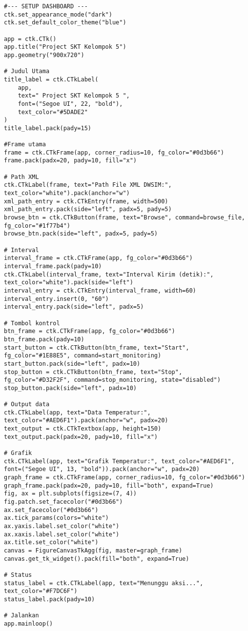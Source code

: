 \documentclass[a4paper, 12pt]{article}
\begin{document}
\begin{lstlisting}[style=pythonstyle, caption={DWSIM (python)}]
#--- SETUP DASHBOARD ---
ctk.set_appearance_mode("dark")
ctk.set_default_color_theme("blue")

app = ctk.CTk()
app.title("Project SKT Kelompok 5")
app.geometry("900x720")

# Judul Utama
title_label = ctk.CTkLabel(
    app,
    text=" Project SKT Kelompok 5 ",
    font=("Segoe UI", 22, "bold"),
    text_color="#5DADE2"
)
title_label.pack(pady=15)

#Frame utama
frame = ctk.CTkFrame(app, corner_radius=10, fg_color="#0d3b66")
frame.pack(padx=20, pady=10, fill="x")

# Path XML
ctk.CTkLabel(frame, text="Path File XML DWSIM:", text_color="white").pack(anchor="w")
xml_path_entry = ctk.CTkEntry(frame, width=500)
xml_path_entry.pack(side="left", padx=5, pady=5)
browse_btn = ctk.CTkButton(frame, text="Browse", command=browse_file, fg_color="#1f77b4")
browse_btn.pack(side="left", padx=5, pady=5)

# Interval
interval_frame = ctk.CTkFrame(app, fg_color="#0d3b66")
interval_frame.pack(pady=10)
ctk.CTkLabel(interval_frame, text="Interval Kirim (detik):", text_color="white").pack(side="left")
interval_entry = ctk.CTkEntry(interval_frame, width=60)
interval_entry.insert(0, "60")
interval_entry.pack(side="left", padx=5)

# Tombol kontrol
btn_frame = ctk.CTkFrame(app, fg_color="#0d3b66")
btn_frame.pack(pady=10)
start_button = ctk.CTkButton(btn_frame, text="Start", fg_color="#1E88E5", command=start_monitoring)
start_button.pack(side="left", padx=10)
stop_button = ctk.CTkButton(btn_frame, text="Stop", fg_color="#D32F2F", command=stop_monitoring, state="disabled")
stop_button.pack(side="left", padx=10)

# Output data
ctk.CTkLabel(app, text="Data Temperatur:", text_color="#AED6F1").pack(anchor="w", padx=20)
text_output = ctk.CTkTextbox(app, height=150)
text_output.pack(padx=20, pady=10, fill="x")

# Grafik
ctk.CTkLabel(app, text="Grafik Temperatur:", text_color="#AED6F1", font=("Segoe UI", 13, "bold")).pack(anchor="w", padx=20)
graph_frame = ctk.CTkFrame(app, corner_radius=10, fg_color="#0d3b66")
graph_frame.pack(padx=20, pady=10, fill="both", expand=True)
fig, ax = plt.subplots(figsize=(7, 4))
fig.patch.set_facecolor("#0d3b66")
ax.set_facecolor("#0d3b66")
ax.tick_params(colors="white")
ax.yaxis.label.set_color("white")
ax.xaxis.label.set_color("white")
ax.title.set_color("white")
canvas = FigureCanvasTkAgg(fig, master=graph_frame)
canvas.get_tk_widget().pack(fill="both", expand=True)

# Status
status_label = ctk.CTkLabel(app, text="Menunggu aksi...", text_color="#F7DC6F")
status_label.pack(pady=10)

# Jalankan
app.mainloop()
\end{lstlisting}
\end{document}

